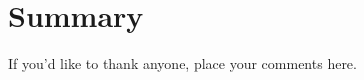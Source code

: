 \documentclass[smallextended]{svjour3}      %
\begin{document}
\section{Summary}
\label{sec:summary}



%

\begin{acknowledgements}
    If you'd like to thank anyone, place your comments here.
\end{acknowledgements}






\end{document}

